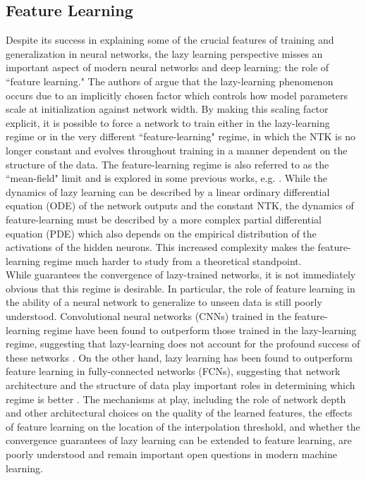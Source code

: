 \documentclass[a4paper, 12pt]{article}
\begin{document}
\subsection{Feature Learning}

Despite its success in explaining some of the crucial features of training and generalization in neural networks, the lazy learning perspective misses an important aspect of modern neural networks and deep learning: the role of ``feature learning."  The authors of \cite{chizatLazyTrainingDifferentiable2020} argue that the lazy-learning phenomenon occurs due to an implicitly chosen factor which controls how model parameters scale at initialization against network width. By making this scaling factor explicit, it is possible to force a network to train either in the lazy-learning regime or in the very different ``feature-learning" regime, in which the NTK is no longer constant and evolves throughout training in a manner dependent on the structure of the data. The feature-learning regime is also referred to as the ``mean-field" limit and is explored in some previous works, e.g. \cite{meiMeanFieldView2018}. While the dynamics of lazy learning can be described by a linear ordinary differential equation (ODE) of the network outputs and the constant NTK, the dynamics of feature-learning must be described by a more complex partial differential equation (PDE) which also depends on the empirical distribution of the activations of the hidden neurons. This increased complexity makes the feature-learning regime much harder to study from a theoretical standpoint.\\

 While \cite{allen-zhuConvergenceTheoryDeep2019} guarantees the convergence of lazy-trained networks, it is not immediately obvious that this regime is desirable. In particular, the role of feature learning in the ability of a neural network to generalize to unseen data is still poorly understood. Convolutional neural networks (CNNs) trained in the feature-learning regime have been found to outperform those trained in the lazy-learning regime, suggesting that lazy-learning does not account for the profound success of these networks \cite{chizatLazyTrainingDifferentiable2020}. On the other hand, lazy learning has been found to outperform feature learning in fully-connected networks (FCNs), suggesting that network architecture and the structure of data play important roles in determining which regime is better \cite{geigerDisentanglingFeatureLazy2020}. The mechanisms at play, including the role of network depth and other architectural choices on the quality of the learned features, the effects of feature learning on the location of the interpolation threshold, and whether the convergence guarantees of lazy learning can be extended to feature learning, are poorly understood and remain important open questions in modern machine learning.
\end{document}
